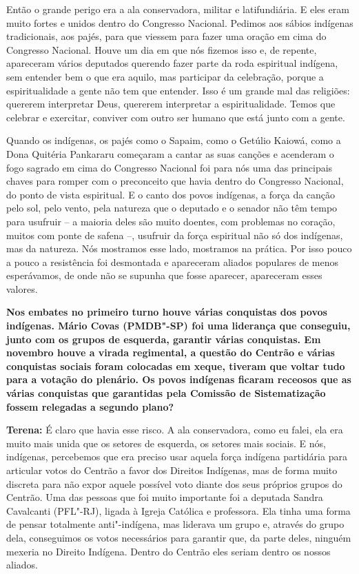 Então o grande perigo era a ala conservadora, militar e latifundiária. E
eles eram muito fortes e unidos dentro do Congresso Nacional. Pedimos
aos sábios indígenas tradicionais, aos pajés, para que viessem para
fazer uma oração em cima do Congresso Nacional. Houve um dia em que nós
fizemos isso e, de repente, apareceram vários deputados querendo fazer
parte da roda espiritual indígena, sem entender bem o que era aquilo,
mas participar da celebração, porque a espiritualidade a gente não tem
que entender. Isso é um grande mal das religiões: quererem interpretar
Deus, quererem interpretar a espiritualidade. Temos que celebrar e
exercitar, conviver com outro ser humano que está junto com a gente.

Quando os indígenas, os pajés como o Sapaim, como o Getúlio Kaiowá, como
a Dona Quitéria Pankararu começaram a cantar as suas canções e acenderam
o fogo sagrado em cima do Congresso Nacional foi para nós uma das
principais chaves para romper com o preconceito que havia dentro do
Congresso Nacional, do ponto de vista espiritual. E o canto dos povos
indígenas, a força da canção pelo sol, pelo vento, pela natureza que o
deputado e o senador não têm tempo para usufruir -- a maioria deles são
muito doentes, com problemas no coração, muitos com ponte de safena --,
usufruir da força espiritual não só dos indígenas, mas da natureza. Nós
mostramos esse lado, mostramos na prática. Por isso pouco a pouco a
resistência foi desmontada e apareceram aliados populares de menos
esperávamos, de onde não se supunha que fosse aparecer, apareceram esses
valores.

\textbf{Nos embates no primeiro turno houve várias conquistas dos povos
indígenas. Mário Covas (PMDB"-SP) foi uma liderança que conseguiu, junto
com os grupos de esquerda, garantir várias conquistas. Em novembro houve
a virada regimental, a questão do Centrão e várias conquistas sociais
foram colocadas em xeque, tiveram que voltar tudo para a votação do
plenário. Os povos indígenas ficaram receosos que as várias conquistas
que garantidas pela Comissão de Sistematização fossem relegadas a
segundo plano?}

\textbf{Terena:} É claro que havia esse risco. A ala conservadora, como
eu falei, ela era muito mais unida que os setores de esquerda, os
setores mais sociais. E nós, indígenas, percebemos que era preciso usar
aquela força indígena partidária para articular votos do Centrão a favor
dos Direitos Indígenas, mas de forma muito discreta para não expor
aquele possível voto diante dos seus próprios grupos do Centrão. Uma das
pessoas que foi muito importante foi a deputada Sandra Cavalcanti
(PFL"-RJ), ligada à Igreja Católica e professora. Ela tinha uma forma de
pensar totalmente anti"-indígena, mas liderava um grupo e, através do
grupo dela, conseguimos os votos necessários para garantir que, da parte
deles, ninguém mexeria no Direito Indígena. Dentro do Centrão eles
seriam dentro os nossos aliados.


